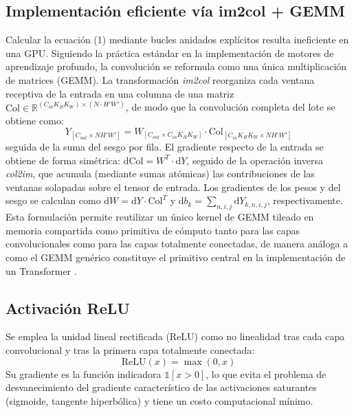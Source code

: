 \documentclass[conference]{IEEEtran}
\begin{document}
\subsection{Implementación eficiente vía im2col + GEMM}
Calcular la ecuación (1) mediante bucles anidados explícitos resulta ineficiente en una GPU. Siguiendo la práctica estándar en la implementación de motores de aprendizaje profundo, la convolución se reformula como una única multiplicación de matrices (GEMM). La transformación \emph{im2col} reorganiza cada ventana receptiva de la entrada en una columna de una matriz $\mathrm{Col}\in\mathbb{R}^{(C_{in}K_HK_W)\times(N\cdot H'W')}$, de modo que la convolución completa del lote se obtiene como:
\begin{equation}
Y_{[C_{out}\times NH'W']} = W_{[C_{out}\times C_{in}K_HK_W]} \cdot \mathrm{Col}_{[C_{in}K_HK_W \times NH'W']}
\end{equation}
seguida de la suma del sesgo por fila. El gradiente respecto de la entrada se obtiene de forma simétrica: $\mathrm{dCol} = W^T \cdot \mathrm{d}Y$, seguido de la operación inversa \emph{col2im}, que acumula (mediante sumas atómicas) las contribuciones de las ventanas solapadas sobre el tensor de entrada. Los gradientes de los pesos y del sesgo se calculan como $\mathrm{d}W = \mathrm{d}Y\cdot\mathrm{Col}^T$ y $\mathrm{d}b_k=\sum_{n,i,j}\mathrm{d}Y_{k,n,i,j}$, respectivamente. Esta formulación permite reutilizar un único kernel de GEMM tileado en memoria compartida como primitiva de cómputo tanto para las capas convolucionales como para las capas totalmente conectadas, de manera análoga a como el GEMM genérico constituye el primitivo central en la implementación de un Transformer \cite{vaswani2017attention}.

\subsection{Activación ReLU}
Se emplea la unidad lineal rectificada (ReLU) \cite{nair2010rectified} como no linealidad tras cada capa convolucional y tras la primera capa totalmente conectada:
\begin{equation}
\mathrm{ReLU}(x) = \max(0, x)
\end{equation}
Su gradiente es la función indicadora $\mathbb{1}[x>0]$, lo que evita el problema de desvanecimiento del gradiente característico de las activaciones saturantes (sigmoide, tangente hiperbólica) y tiene un costo computacional mínimo.
\end{document}
